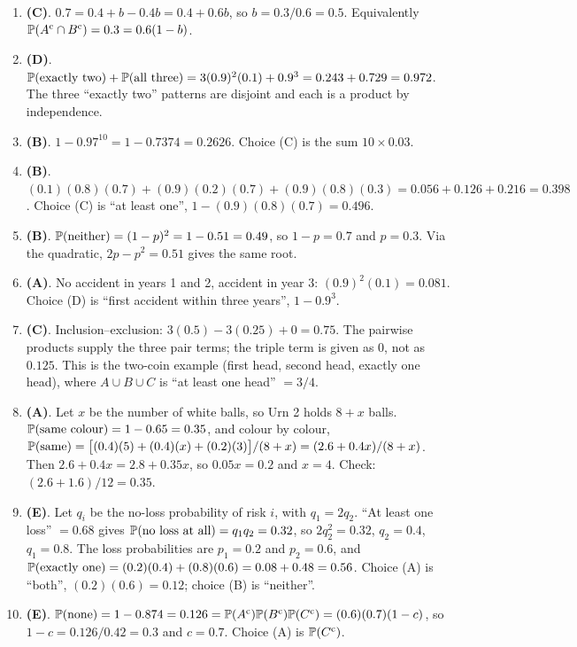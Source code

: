 \begin{enumerate}[label=\arabic*.,nosep]
\item \textbf{(C)}. $0.7 = 0.4 + b - 0.4b = 0.4 + 0.6b$, so $b = 0.3/0.6 = 0.5$. Equivalently $\mathbb{P}(A^{\mathrm{c}} \cap B^{\mathrm{c}}) = 0.3 = 0.6(1-b)$.
\item \textbf{(D)}. $\mathbb{P}(\text{exactly two}) + \mathbb{P}(\text{all three}) = 3(0.9)^2(0.1) + 0.9^3 = 0.243 + 0.729 = 0.972$. The three ``exactly two'' patterns are disjoint and each is a product by independence.
\item \textbf{(B)}. $1 - 0.97^{10} = 1 - 0.7374 = 0.2626$. Choice (C) is the sum $10 \times 0.03$.
\item \textbf{(B)}. $(0.1)(0.8)(0.7) + (0.9)(0.2)(0.7) + (0.9)(0.8)(0.3) = 0.056 + 0.126 + 0.216 = 0.398$. Choice (C) is ``at least one'', $1 - (0.9)(0.8)(0.7) = 0.496$.
\item \textbf{(B)}. $\mathbb{P}(\text{neither}) = (1-p)^2 = 1 - 0.51 = 0.49$, so $1 - p = 0.7$ and $p = 0.3$. Via the quadratic, $2p - p^2 = 0.51$ gives the same root.
\item \textbf{(A)}. No accident in years 1 and 2, accident in year 3: $(0.9)^2(0.1) = 0.081$. Choice (D) is ``first accident within three years'', $1 - 0.9^3$.
\item \textbf{(C)}. Inclusion--exclusion: $3(0.5) - 3(0.25) + 0 = 0.75$. The pairwise products supply the three pair terms; the triple term is given as $0$, not as $0.125$. This is the two-coin example (first head, second head, exactly one head), where $A \cup B \cup C$ is ``at least one head'' $= 3/4$.
\item \textbf{(A)}. Let $x$ be the number of white balls, so Urn 2 holds $8 + x$ balls. $\mathbb{P}(\text{same colour}) = 1 - 0.65 = 0.35$, and colour by colour,
$\mathbb{P}(\text{same}) = \bigl[(0.4)(5) + (0.4)(x) + (0.2)(3)\bigr]/(8+x) = (2.6 + 0.4x)/(8 + x)$. Then $2.6 + 0.4x = 2.8 + 0.35x$, so $0.05x = 0.2$ and $x = 4$. Check: $(2.6 + 1.6)/12 = 0.35$.
\item \textbf{(E)}. Let $q_i$ be the no-loss probability of risk $i$, with $q_1 = 2q_2$. ``At least one loss'' $= 0.68$ gives $\mathbb{P}(\text{no loss at all}) = q_1 q_2 = 0.32$, so $2q_2^2 = 0.32$, $q_2 = 0.4$, $q_1 = 0.8$. The loss probabilities are $p_1 = 0.2$ and $p_2 = 0.6$, and $\mathbb{P}(\text{exactly one}) = (0.2)(0.4) + (0.8)(0.6) = 0.08 + 0.48 = 0.56$. Choice (A) is ``both'', $(0.2)(0.6) = 0.12$; choice (B) is ``neither''.
\item \textbf{(E)}. $\mathbb{P}(\text{none}) = 1 - 0.874 = 0.126 = \mathbb{P}(A^{\mathrm{c}})\mathbb{P}(B^{\mathrm{c}})\mathbb{P}(C^{\mathrm{c}}) = (0.6)(0.7)(1 - c)$, so $1 - c = 0.126/0.42 = 0.3$ and $c = 0.7$. Choice (A) is $\mathbb{P}(C^{\mathrm{c}})$.

\end{enumerate}
